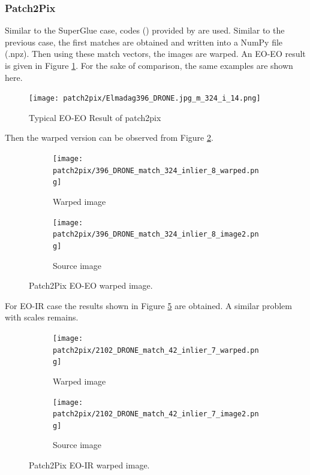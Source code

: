 \documentclass[letterpaper,12pt]{article}
\begin{document}
\subsubsection{Patch2Pix}
Similar to the SuperGlue case, codes (\cite{patch2pixcode}) provided by \cite{ZhouCVPRpatch2pix} are used. Similar to the previous case, the first matches are obtained and written into a NumPy file (.npz). Then using these match vectors, the images are warped. An EO-EO result is given in Figure \ref{eo-eo-patch2pix_0}. For the sake of comparison, the same examples are shown here.


\begin{figure}[H]
    \centering
    \texttt{[image: patch2pix/Elmadag396\_DRONE.jpg\_m\_324\_i\_14.png]}
    \caption{Typical EO-EO Result of patch2pix}
    \label{eo-eo-patch2pix_0}
\end{figure} 
Then the warped version can be observed from Figure \ref{fig:eo-eo-patch2pix-warped}.
\begin{figure}[H]
    \centering
    \begin{subfigure}{.4\textwidth}

    \texttt{[image: patch2pix/396\_DRONE\_match\_324\_inlier\_8\_warped.png]}
    \caption{Warped image}
    \label{fig:eo-eo-patch2pix-warped}
    \end{subfigure}
    \begin{subfigure}{.4\textwidth}
    \texttt{[image: patch2pix/396\_DRONE\_match\_324\_inlier\_8\_image2.png]}
    
    \caption{Source image}
    \label{fig:eo-eo-patch2pix-warped_0}
    \end{subfigure}
    \caption{Patch2Pix EO-EO warped image.}
\end{figure} 

For EO-IR case the results shown in Figure \ref{fig:eo-ir-patch2pix-warped} are obtained. A similar problem with scales remains.

\begin{figure}[H]
    \centering
    \begin{subfigure}{.4\textwidth}

    \texttt{[image: patch2pix/2102\_DRONE\_match\_42\_inlier\_7\_warped.png]}
    \caption{Warped image}
    \label{fig:eo-ir-patch2pix-warped}
    \end{subfigure}
    \begin{subfigure}{.4\textwidth}
    \texttt{[image: patch2pix/2102\_DRONE\_match\_42\_inlier\_7\_image2.png]}
    
    \caption{Source image}
    \label{fig:eo-ir-patch2pix-warped_0}
    \end{subfigure}
    \caption{Patch2Pix EO-IR warped image.}
\end{figure} 
\end{document}
